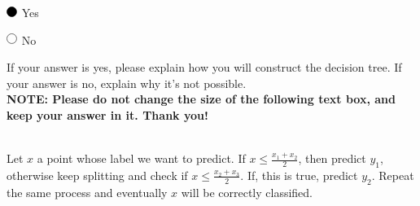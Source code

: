 \begin{enumerate}
    \begin{list}{}
        \item $\blackcircle$ Yes
        \item $\circle$ No
    \end{list}
     If your answer is yes, please explain how you will construct the decision tree. If your answer is no, explain why it’s not possible.  \\
   
    \textbf{NOTE: Please do not change the size of the following text box, and keep your answer in it. Thank you!} \\ \\
    \begin{tcolorbox}[fit,height=4cm, width=15cm, blank, borderline={1pt}{-2pt},nobeforeafter]
    \large
    Let $x$ a point whose label we want to predict. If $x \leq \frac{x_1+x_2}{2}$, then predict $y_1$, otherwise keep splitting and check if $x \leq \frac{x_2+x_3}{2}$. If, this is true, predict $y_2$. Repeat the same process and eventually $x$ will be correctly classified.

    \end{tcolorbox} \\
    
    

    

\end{enumerate}



